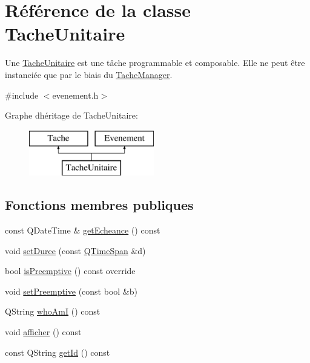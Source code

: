 \hypertarget{class_tache_unitaire}{}\section{Référence de la classe Tache\+Unitaire}
\label{class_tache_unitaire}


Une \hyperlink{class_tache_unitaire}{Tache\+Unitaire} est une tâche programmable et composable. Elle ne peut être instanciée que par le biais du \hyperlink{class_tache_manager}{Tache\+Manager}.  




{\ttfamily \#include $<$evenement.\+h$>$}

Graphe d\textquotesingle{}héritage de Tache\+Unitaire\+:\begin{figure}[H]
\begin{center}
\leavevmode
\includegraphics[height=2.000000cm]{class_tache_unitaire}
\end{center}
\end{figure}
\subsection*{Fonctions membres publiques}
\begin{DoxyCompactItemize}
\item 
const Q\+Date\+Time \& \hyperlink{class_tache_unitaire_a931e6c45135ed4cd554826fad8359ff5}{get\+Echeance} () const 
\item 
void \hyperlink{class_tache_unitaire_a4065892def718cee931fe8bdbafa7ffc}{set\+Duree} (const \hyperlink{class_q_time_span}{Q\+Time\+Span} \&d)
\item 
bool \hyperlink{class_tache_unitaire_a93e310a15ded15de3f8cd281120d8b37}{is\+Preemptive} () const override
\item 
void \hyperlink{class_tache_unitaire_abb5fe9e4ca36a2f08b3e8c04555c445d}{set\+Preemptive} (const bool \&b)
\item 
Q\+String \hyperlink{class_tache_unitaire_aa7c4a19559acd6f9267754b611d27cc2}{who\+Am\+I} () const 
\item 
void \hyperlink{class_tache_unitaire_a8f28f8372a319aaee49881487f530a60}{afficher} () const 
\item 
const Q\+String \hyperlink{class_tache_unitaire_af0fbc4b33b3a844dd6a2a1bffde5ec67}{get\+Id} () const 
\end{DoxyCompactItemize}
